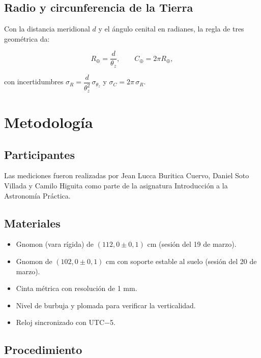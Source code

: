 \documentclass[stu,12pt,floatsintext]{apa7}
\begin{document}
\subsection{Radio y circunferencia de la Tierra}

Con la distancia meridional $d$ y el ángulo cenital en radianes, la regla de tres
geométrica da:

\begin{equation}
    R_\oplus = \frac{d}{\theta_z},
    \qquad
    C_\oplus = 2\pi R_\oplus,
    \label{eq:radio}
\end{equation}

con incertidumbres $\sigma_R = \dfrac{d}{\theta_z^2}\,\sigma_{\theta_z}$ y
$\sigma_C = 2\pi\,\sigma_R$.

\section{Metodología}

\subsection{Participantes}

Las mediciones fueron realizadas por Jean Lucca Buritica Cuervo, Daniel Soto Villada y
Camilo Higuita como parte de la asignatura Introducción a la Astronomía Práctica.

\subsection{Materiales}

\begin{itemize}
    \item Gnomon (vara rígida) de $(112{,}0 \pm 0{,}1)$ cm (sesión del 19 de marzo).
    \item Gnomon de $(102{,}0 \pm 0{,}1)$ cm con soporte estable al suelo (sesión del 20 de marzo).
    \item Cinta métrica con resolución de 1 mm.
    \item Nivel de burbuja y plomada para verificar la verticalidad.
    \item Reloj sincronizado con UTC−5.
\end{itemize}

\subsection{Procedimiento}
\end{document}
